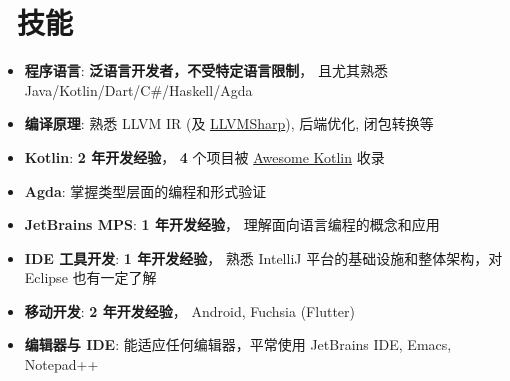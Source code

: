 \documentclass{resume}
\begin{document}
\section{\faCogs\ 技能}
\begin{itemize}[parsep=0.5ex]
  \item \textbf{程序语言}:
    \textbf{泛语言开发者，不受特定语言限制}，
    且尤其熟悉 Java/Kotlin/Dart/C\#/Haskell/Agda

  \item \textbf{编译原理}:
    熟悉 LLVM IR (及 \href{https://github.com/Microsoft/LLVMSharp/} {LLVMSharp}), 后端优化, 闭包转换等

  \item \textbf{Kotlin}:
    \textbf{2 年开发经验}，
    \textbf{4} 个项目被
    \href{https://kotlin.link/?q=ice} {Awesome Kotlin}
    收录

  \item \textbf{Agda}:
    掌握类型层面的编程和形式验证

  \item \textbf{JetBrains MPS}:
    \textbf{1 年开发经验}，
    理解面向语言编程的概念和应用

  \item \textbf{IDE 工具开发}:
    \textbf{1 年开发经验}，
    熟悉 IntelliJ 平台的基础设施和整体架构，对 Eclipse 也有一定了解

  \item \textbf{移动开发}:
    \textbf{2 年开发经验}，
    Android, Fuchsia (Flutter)

  \item \textbf{编辑器与 IDE}:
    能适应任何编辑器，平常使用 JetBrains IDE, Emacs, Notepad++
\end{itemize}

\end{document}
